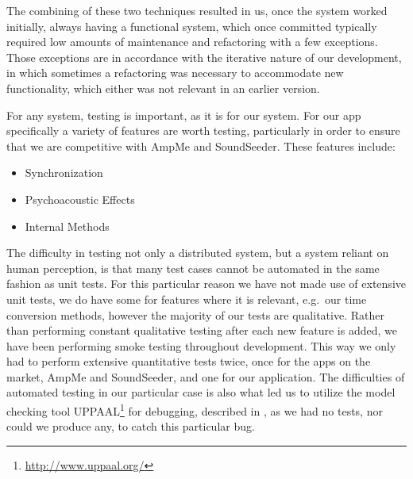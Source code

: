 The combining of these two techniques resulted in us, once the system worked initially, always having a functional system, which once committed typically required low amounts of maintenance and refactoring with a few exceptions.
Those exceptions are in accordance with the iterative nature of our development, in which sometimes a refactoring was necessary to accommodate new functionality, which either was not relevant in an earlier version.

\bigskip
For any system, testing is important, as it is for our system.
For our app specifically a variety of features are worth testing, particularly in order to ensure that we are competitive with AmpMe and SoundSeeder.
These features include:
\begin{multicols}{3}
\begin{itemize}
    \item Synchronization
    \item Psychoacoustic Effects
    \item Internal Methods
\end{itemize}
\end{multicols}

The difficulty in testing not only a distributed system, but a system reliant on human perception, is that many test cases cannot be automated in the same fashion as unit tests.
For this particular reason we have not made use of extensive unit tests, we do have some for features where it is relevant, e.g.\ our time conversion methods, however the majority of our tests are qualitative.
Rather than performing constant qualitative testing after each new feature is added, we have been performing smoke testing throughout development.
This way we only had to perform extensive quantitative tests twice, once for the apps on the market, AmpMe and SoundSeeder, and one for our application.
The difficulties of automated testing in our particular case is also what led us to utilize the model checking tool UPPAAL\footnote{\url{http://www.uppaal.org/}} for debugging, described in , as we had no tests, nor could we produce any, to catch this particular bug.

